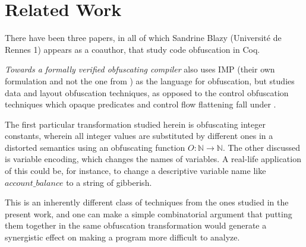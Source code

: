 \documentclass[compsoc,conference,a4paper,10pt,times]{IEEEtran}
\begin{document}
\section{Related Work}
There have been three papers, in all of which Sandrine Blazy (Universit\'{e} de Rennes 1) appears as a coauthor, that study code obfuscation in Coq.

\par \emph{Towards a formally verified obfuscating compiler} \cite{Blazy1} also uses IMP (their own formulation and not the one from \cite{SFV2}) as the language for obfuscation, but studies data and layout obfuscation techniques, as opposed to the control obfuscation techniques which opaque predicates and control flow flattening fall under \cite{CollbergTax}.
\par The first particular transformation studied herein is obfuscating integer constants, wherein all integer values are substituted by different ones in a distorted semantics using an obfuscating function $O: \mathbb{N} \to \mathbb{N}$.  The other discussed is variable encoding, which changes the names of variables.  A real-life application of this could be, for instance, to change a descriptive variable name like $account\_balance$ to a string of gibberish.
\par This is an inherently different class of techniques from the ones studied in the present work, and one can make a simple combinatorial argument that putting them together in the same obfuscation transformation would generate a synergistic effect on making a program more difficult to analyze.
\end{document}

